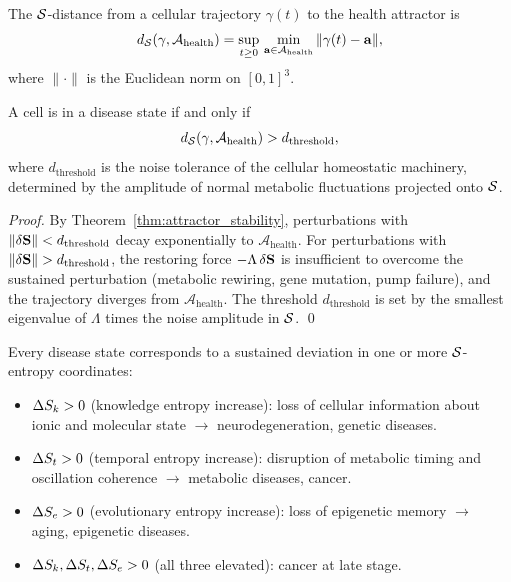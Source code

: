 \begin{definition}
\label{def:sspace_distance}
The $\mathcal{S}$-distance from a cellular trajectory $\gamma(t)$ to the health
attractor is
\begin{equation}
  d_{\mathcal{S}}\!\left(\gamma, \mathcal{A}_{\mathrm{health}}\right)
    = \sup_{t \geq 0}\,\min_{\mathbf{a}\in\mathcal{A}_{\mathrm{health}}}
      \|\gamma(t) - \mathbf{a}\|,
  \label{eq:sspace_distance}
\end{equation}
where $\|\cdot\|$ is the Euclidean norm on $[0,1]^3$.
\end{definition}

\begin{theorem}
\label{thm:disease_deviation}
A cell is in a disease state if and only if
\begin{equation}
  d_{\mathcal{S}}\!\left(\gamma, \mathcal{A}_{\mathrm{health}}\right) > d_{\mathrm{threshold}},
  \label{eq:disease_condition}
\end{equation}
where $d_{\mathrm{threshold}}$ is the noise tolerance of the cellular
homeostatic machinery, determined by the amplitude of normal metabolic
fluctuations projected onto $\mathcal{S}$.
\end{theorem}

\begin{proof}
By Theorem~\ref{thm:attractor_stability}, perturbations with
$\|\delta\mathbf{S}\| < d_{\mathrm{threshold}}$ decay exponentially to
$\mathcal{A}_{\mathrm{health}}$. For perturbations with
$\|\delta\mathbf{S}\| > d_{\mathrm{threshold}}$, the restoring force
$-\Lambda\,\delta\mathbf{S}$ is insufficient to overcome the sustained
perturbation (metabolic rewiring, gene mutation, pump failure), and the
trajectory diverges from $\mathcal{A}_{\mathrm{health}}$. The threshold
$d_{\mathrm{threshold}}$ is set by the smallest eigenvalue of $\Lambda$
times the noise amplitude in $\mathcal{S}$. \qed
\end{proof}

\begin{theorem}
\label{thm:disease_classification}
Every disease state corresponds to a sustained deviation in one or more
$\mathcal{S}$-entropy coordinates:
\begin{itemize}
  \item $\Delta S_k > 0$ (knowledge entropy increase): loss of cellular
        information about ionic and molecular state
        $\to$ neurodegeneration, genetic diseases.
  \item $\Delta S_t > 0$ (temporal entropy increase): disruption of metabolic
        timing and oscillation coherence
        $\to$ metabolic diseases, cancer.
  \item $\Delta S_e > 0$ (evolutionary entropy increase): loss of epigenetic
        memory
        $\to$ aging, epigenetic diseases.
  \item $\Delta S_k, \Delta S_t, \Delta S_e > 0$ (all three elevated):
        cancer at late stage.
\end{itemize}
\end{theorem}

